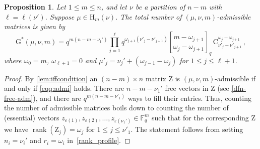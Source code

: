 \documentclass[12pt,a4paper,reqno]{amsart}
\theoremstyle{plain}
\newtheorem{proposition}[theorem]{Proposition}
\theoremstyle{definition}
\newcommand{\FF}{{\mathbb{F}}}
\newcommand{\1}{\mathds{1}}
\newcommand{\G}{{\mathrm{G}}}
\newcommand{\HH}{\mathrm{H}}
\newcommand{\Z}{\mathrm{Z}}
\DeclareMathOperator{\rk}{rank}
\begin{document}
\begin{proposition}\label{addmissible_number} Let $1 \leq m \leq n$, and let $\nu$ be a partition of $n - m$ with $\ell = \ell(\nu')$. Suppose $\mu \in \HH_m(\nu)$. The total number of $(\mu, \nu, m)$-admissible matrices is given by
\begin{equation}
\G^*(\mu,\nu,m)=q^{m(n-m-\nu_1')}\prod_{j=1}^{\ell}q^{\omega_{j+1}(\nu'_j-\nu'_{j+1})}{m-\omega_{j+1}\brack \omega_{j}-\omega_{j+1}}_q\,\mathrm{C}^{\omega_j-\omega_{j+1}}_{\nu'_j-\nu'_{j+1}}\, ,
\end{equation}
where $\omega_0=m$, $\omega_{\ell+1}=0$ and $\mu'_{j}=\nu_j'+(\omega_{j-1}-\omega_j)$ for $1\leq j\leq \ell+1$. 
\end{proposition}
\begin{proof}
By \cref{lem:iffcondition} an $(n-m)\times n$ matrix $\Z$ is $(\mu,\nu,m)$-admissible if and only if \cref{eqq:admi} holds. 
There are $n-m-\nu_1'$ free vectors
in $\Z$ (see \cref{dfn-free-adm}), and there are $q^{m(n-m-\nu'_1)}$ ways to fill their entries. 
Thus, counting the number of  admissible matrices boils down to counting the number of (essential) vectors 
$z_{\varepsilon(1)},z_{\varepsilon(2)},\dots,z_{\varepsilon(\nu_1')}\in \FF_q^m$
such that for the corresponding $\Z$ we have  $\rk(\Z_j)=\omega_j$ for $1\leq j\leq \nu'_1$. 
The statement follows from setting $n_i=\nu_i'$ and $r_i=\omega_i$ 
in~\cref{rank_profile}. 
\end{proof}


\end{document}
